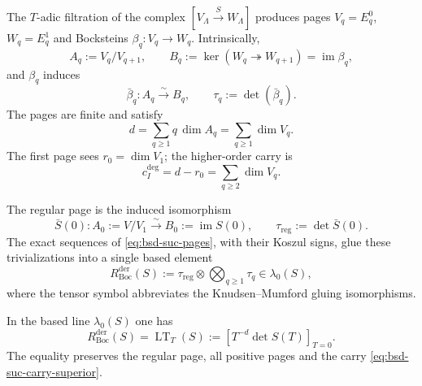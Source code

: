 The \(T\)-adic filtration of the complex
\([V_{\Lambda}\xrightarrow{S}W_{\Lambda}]\) produces pages
\(V_q=E_q^0\), \(W_q=E_q^1\) and Bocksteins
\(\beta_q:V_q\to W_q\). Intrinsically,
\begin{equation}\label{eq:bsd-suc-pages}
 A_q:=V_q/V_{q+1},
 \qquad
 B_q:=\ker(W_q\twoheadrightarrow W_{q+1})
      =\operatorname{im}\beta_q,
\end{equation}
and \(\beta_q\) induces
\begin{equation}\label{eq:bsd-suc-beta-q}
 \bar\beta_q:A_q\xrightarrow{\ \sim\ }B_q,
 \qquad
 \tau_q:=\det(\bar\beta_q).
\end{equation}
The pages are finite and satisfy
\begin{equation}\label{eq:bsd-suc-carry-orden}
 d=\sum_{q\geq1}q\,\dim A_q
  =\sum_{q\geq1}\dim V_q.
\end{equation}
The first page sees
\(r_0=\dim V_1\); the higher-order carry is
\begin{equation}\label{eq:bsd-suc-carry-superior}
 c_I^{\deg}=d-r_0=\sum_{q\geq2}\dim V_q.
\end{equation}

The regular page is the induced isomorphism
\begin{equation}\label{eq:bsd-suc-pagina-regular}
 \bar S(0):A_0:=V/V_1
 \xrightarrow{\ \sim\ }
 B_0:=\operatorname{im}S(0),
 \qquad
 \tau_{\mathrm{reg}}:=\det\bar S(0).
\end{equation}
The exact sequences of \eqref{eq:bsd-suc-pages}, with their Koszul
signs, glue these trivializations into a single based element
\begin{equation}\label{eq:bsd-suc-rboc}
 R_{\mathrm{Boc}}^{\mathrm{der}}(S)
 :=\tau_{\mathrm{reg}}\otimes
   \bigotimes_{q\geq1}\tau_q
 \in\lambda_0(S),
\end{equation}
where the tensor symbol abbreviates the Knudsen--Mumford gluing
isomorphisms.

\begin{theorem}
\label{thm:bsd-suc-bockstein}
In the based line \(\lambda_0(S)\) one has
\begin{equation}\label{eq:bsd-suc-lt}
 R_{\mathrm{Boc}}^{\mathrm{der}}(S)
 =\operatorname{LT}_{T}(S)
 :=\left[T^{-d}\det S(T)\right]_{T=0}.
\end{equation}
The equality preserves the regular page, all positive pages and the
carry \eqref{eq:bsd-suc-carry-superior}.
\end{theorem}

